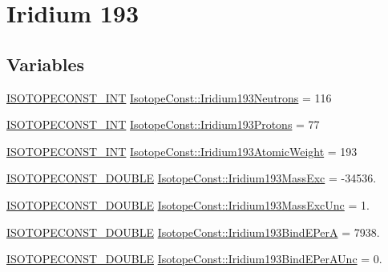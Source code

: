 \hypertarget{group___isotope_const-_iridium-_ir193}{}\section{Iridium 193}
\label{group___isotope_const-_iridium-_ir193}
\subsection*{Variables}
\begin{DoxyCompactItemize}
\item 
\mbox{\hyperlink{group___isotope_const-_macros_ga5f18360b3e99483a35c32d789e62621c}{I\+S\+O\+T\+O\+P\+E\+C\+O\+N\+S\+T\+\_\+\+I\+NT}} \mbox{\hyperlink{group___isotope_const-_iridium-_ir193_ga9f6bf9cdfd2f34d881bd28da006b966d}{Isotope\+Const\+::\+Iridium193\+Neutrons}} = 116
\item 
\mbox{\hyperlink{group___isotope_const-_macros_ga5f18360b3e99483a35c32d789e62621c}{I\+S\+O\+T\+O\+P\+E\+C\+O\+N\+S\+T\+\_\+\+I\+NT}} \mbox{\hyperlink{group___isotope_const-_iridium-_ir193_ga09cf853c96bc71826d4fdd18a5e52fe9}{Isotope\+Const\+::\+Iridium193\+Protons}} = 77
\item 
\mbox{\hyperlink{group___isotope_const-_macros_ga5f18360b3e99483a35c32d789e62621c}{I\+S\+O\+T\+O\+P\+E\+C\+O\+N\+S\+T\+\_\+\+I\+NT}} \mbox{\hyperlink{group___isotope_const-_iridium-_ir193_ga8f93ca97e165ef87bd7664720d292de1}{Isotope\+Const\+::\+Iridium193\+Atomic\+Weight}} = 193
\item 
\mbox{\hyperlink{group___isotope_const-_macros_ga8f45a7272ce02c0b4c65c44636ed719a}{I\+S\+O\+T\+O\+P\+E\+C\+O\+N\+S\+T\+\_\+\+D\+O\+U\+B\+LE}} \mbox{\hyperlink{group___isotope_const-_iridium-_ir193_ga4f3667c0eb9abe38defcf38acb5f50fe}{Isotope\+Const\+::\+Iridium193\+Mass\+Exc}} = -\/34536.
\item 
\mbox{\hyperlink{group___isotope_const-_macros_ga8f45a7272ce02c0b4c65c44636ed719a}{I\+S\+O\+T\+O\+P\+E\+C\+O\+N\+S\+T\+\_\+\+D\+O\+U\+B\+LE}} \mbox{\hyperlink{group___isotope_const-_iridium-_ir193_ga2fc469bb12aa7cb4fec55f9d89197052}{Isotope\+Const\+::\+Iridium193\+Mass\+Exc\+Unc}} = 1.
\item 
\mbox{\hyperlink{group___isotope_const-_macros_ga8f45a7272ce02c0b4c65c44636ed719a}{I\+S\+O\+T\+O\+P\+E\+C\+O\+N\+S\+T\+\_\+\+D\+O\+U\+B\+LE}} \mbox{\hyperlink{group___isotope_const-_iridium-_ir193_gac3b89c1ff120e06381426742428506dd}{Isotope\+Const\+::\+Iridium193\+Bind\+E\+PerA}} = 7938.
\item 
\mbox{\hyperlink{group___isotope_const-_macros_ga8f45a7272ce02c0b4c65c44636ed719a}{I\+S\+O\+T\+O\+P\+E\+C\+O\+N\+S\+T\+\_\+\+D\+O\+U\+B\+LE}} \mbox{\hyperlink{group___isotope_const-_iridium-_ir193_ga6775ffb99a49e4f6815765160dab28f9}{Isotope\+Const\+::\+Iridium193\+Bind\+E\+Per\+A\+Unc}} = 0.

\end{DoxyCompactItemize}
